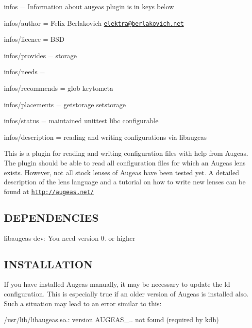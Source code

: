 
\begin{DoxyItemize}
\item infos = Information about augeas plugin is in keys below
\item infos/author = Felix Berlakovich \href{mailto:elektra@berlakovich.net}{\tt elektra@berlakovich.\+net}
\item infos/licence = B\+S\+D
\item infos/provides = storage
\item infos/needs =
\item infos/recommends = glob keytometa
\item infos/placements = getstorage setstorage
\item infos/status = maintained unittest libc configurable
\item infos/description = reading and writing configurations via libaugeas
\end{DoxyItemize}

This is a plugin for reading and writing configuration files with help from Augeas. The plugin should be able to read all configuration files for which an Augeas lens exists. However, not all stock lenses of Augeas have been tested yet. A detailed description of the lens language and a tutorial on how to write new lenses can be found at \href{http://augeas.net/}{\tt http\+://augeas.\+net/}

\subsection*{D\+E\+P\+E\+N\+D\+E\+N\+C\+I\+E\+S}


\begin{DoxyItemize}
\item {\ttfamily libaugeas-\/dev}\+: You need version 0. or higher
\end{DoxyItemize}

\subsection*{I\+N\+S\+T\+A\+L\+L\+A\+T\+I\+O\+N}

If you have installed Augeas manually, it may be necessary to update the ld configuration. This is especially true if an older version of Augeas is installed also. Such a situation may lead to an error similar to this\+:

/usr/lib/libaugeas.so.\+: version {\ttfamily A\+U\+G\+E\+A\+S\+\_..} not found (required by kdb)

